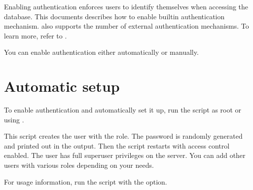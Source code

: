 \documentclass[letterpaper,10pt,english]{sphinxmanual}
\begin{document}
\sphinxAtStartPar
Enabling authentication enforces users to identify themselves when accessing the database. This documents describes how to enable built\sphinxhyphen{}in authentication mechanism.  also supports the number of external authentication mechanisms. To learn more, refer to {\hyperref[\detokenize{authentication:ext-auth}]{}}.

\sphinxAtStartPar
You can enable authentication either automatically or manually.


\section{Automatic setup}
\label{\detokenize{enable-auth:automatic-setup}}
\sphinxAtStartPar
To enable authentication and automatically set it up,
run the  script
as root or using .

\sphinxAtStartPar
This script creates the  user with the  role.
The password is randomly generated and printed out in the output.
Then the script restarts  with access control enabled.
The  user has full superuser privileges on the server.
You can add other users with various roles depending on your needs.

\sphinxAtStartPar
For usage information, run the script with the  option.
\end{document}
